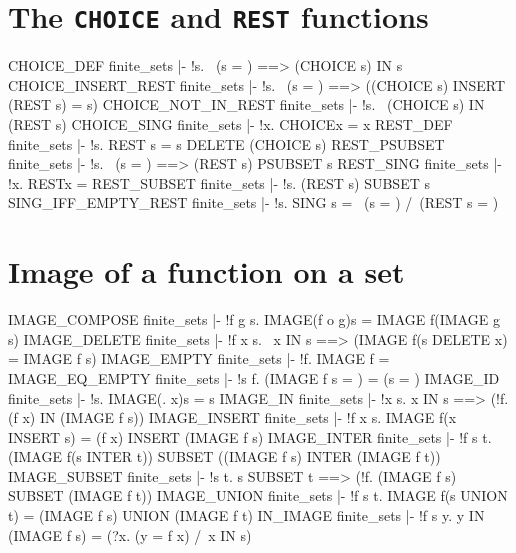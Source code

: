 \section{The {\tt CHOICE} and {\tt REST} functions}
\THEOREM CHOICE\_DEF finite\_sets
|- !s. ~(s = {}) ==> (CHOICE s) IN s
\ENDTHEOREM
\THEOREM CHOICE\_INSERT\_REST finite\_sets
|- !s. ~(s = {}) ==> ((CHOICE s) INSERT (REST s) = s)
\ENDTHEOREM
\THEOREM CHOICE\_NOT\_IN\_REST finite\_sets
|- !s. ~(CHOICE s) IN (REST s)
\ENDTHEOREM
\THEOREM CHOICE\_SING finite\_sets
|- !x. CHOICE{x} = x
\ENDTHEOREM
\THEOREM REST\_DEF finite\_sets
|- !s. REST s = s DELETE (CHOICE s)
\ENDTHEOREM
\THEOREM REST\_PSUBSET finite\_sets
|- !s. ~(s = {}) ==> (REST s) PSUBSET s
\ENDTHEOREM
\THEOREM REST\_SING finite\_sets
|- !x. REST{x} = {}
\ENDTHEOREM
\THEOREM REST\_SUBSET finite\_sets
|- !s. (REST s) SUBSET s
\ENDTHEOREM
\THEOREM SING\_IFF\_EMPTY\_REST finite\_sets
|- !s. SING s = ~(s = {}) /\ (REST s = {})
\ENDTHEOREM
\section{Image of a function on a set}
\THEOREM IMAGE\_COMPOSE finite\_sets
|- !f g s. IMAGE(f o g)s = IMAGE f(IMAGE g s)
\ENDTHEOREM
\THEOREM IMAGE\_DELETE finite\_sets
|- !f x s. ~x IN s ==> (IMAGE f(s DELETE x) = IMAGE f s)
\ENDTHEOREM
\THEOREM IMAGE\_EMPTY finite\_sets
|- !f. IMAGE f{} = {}
\ENDTHEOREM
\THEOREM IMAGE\_EQ\_EMPTY finite\_sets
|- !s f. (IMAGE f s = {}) = (s = {})
\ENDTHEOREM
\THEOREM IMAGE\_ID finite\_sets
|- !s. IMAGE(\x. x)s = s
\ENDTHEOREM
\THEOREM IMAGE\_IN finite\_sets
|- !x s. x IN s ==> (!f. (f x) IN (IMAGE f s))
\ENDTHEOREM
\THEOREM IMAGE\_INSERT finite\_sets
|- !f x s. IMAGE f(x INSERT s) = (f x) INSERT (IMAGE f s)
\ENDTHEOREM
\THEOREM IMAGE\_INTER finite\_sets
|- !f s t. (IMAGE f(s INTER t)) SUBSET ((IMAGE f s) INTER (IMAGE f t))
\ENDTHEOREM
\THEOREM IMAGE\_SUBSET finite\_sets
|- !s t. s SUBSET t ==> (!f. (IMAGE f s) SUBSET (IMAGE f t))
\ENDTHEOREM
\THEOREM IMAGE\_UNION finite\_sets
|- !f s t. IMAGE f(s UNION t) = (IMAGE f s) UNION (IMAGE f t)
\ENDTHEOREM
\THEOREM IN\_IMAGE finite\_sets
|- !f s y. y IN (IMAGE f s) = (?x. (y = f x) /\ x IN s)
\ENDTHEOREM
